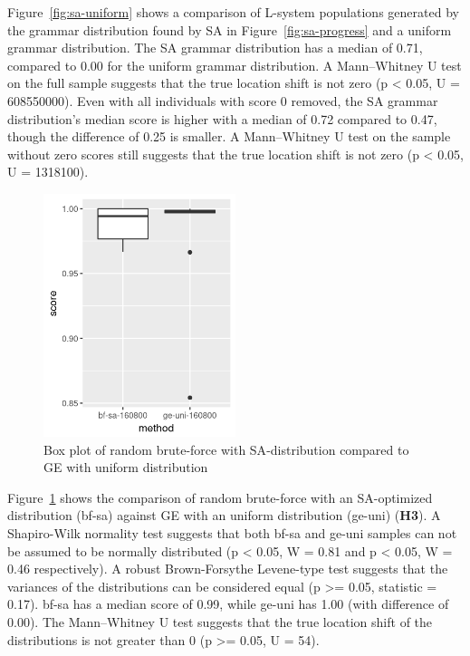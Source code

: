 Figure~\ref{fig:sa-uniform} shows a comparison of \gls{L-system} populations generated by the grammar distribution found by \gls{SA} in Figure~\ref{fig:sa-progress} and a uniform grammar distribution.
The \gls{SA} grammar distribution has a median of 0.71, compared to 0.00 for the uniform grammar distribution.
A Mann–Whitney U test on the full sample suggests that the true location shift is not zero (p < 0.05, U = 608550000).
Even with all individuals with score 0 removed, the \gls{SA} grammar distribution's median score is higher with a median of 0.72 compared to 0.47, though the difference of 0.25 is smaller.
A Mann–Whitney U test on the sample without zero scores still suggests that the true location shift is not zero (p < 0.05, U = 1318100).

\begin{figure}
    \centering
    \includegraphics[width=0.5\textwidth]{figures/bfsa-geuni}
    \caption[SA-optimized brute-force compared to uniform GE]{Box plot of random brute-force with \gls{SA}-distribution compared to \gls{GE} with uniform distribution}
    \label{fig:h3}
\end{figure}

Figure~\ref{fig:h3} shows the comparison of random brute-force with an \gls{SA}-optimized distribution (bf-sa) against \gls{GE} with an uniform distribution (ge-uni) (\textbf{H3}).
A Shapiro-Wilk normality test suggests that both bf-sa and ge-uni samples can not be assumed to be normally distributed (p < 0.05, W = 0.81 and p < 0.05, W = 0.46 respectively).
A robust Brown-Forsythe Levene-type test suggests that the variances of the distributions can be considered equal (p >= 0.05, statistic = 0.17).
bf-sa has a median score of 0.99, while ge-uni has 1.00 (with difference of 0.00).
The Mann–Whitney U test suggests that the true location shift of the distributions is not greater than 0 (p >= 0.05, U = 54).

